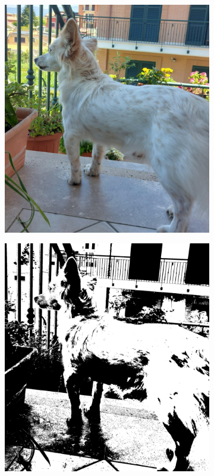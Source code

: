 \begin{toReview}
\begin{figure}[ht]
	\centering
	\begin{subfigure}{0.4\linewidth}
		\includegraphics[width=\linewidth]{Figures/example.jpeg}
	\end{subfigure}
	\hspace{2cm}
	\begin{subfigure}{0.4\linewidth}
		\includegraphics[width=\linewidth]{Figures/example_bw.jpeg}

\end{subfigure}
\end{figure}
\end{toReview}
